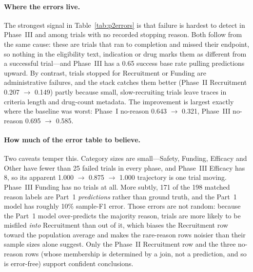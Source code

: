 \paragraph{Where the errors live.}
The strongest signal in Table~\ref{tab:p2errors} is that failure is hardest to
detect in Phase~III and among trials with no recorded stopping reason. Both follow
from the same cause: these are trials that ran to completion and missed their
endpoint, so nothing in the eligibility text, indication or drug marks them as
different from a successful trial---and Phase~III has a 0.65 success base rate
pulling predictions upward. By contrast, trials stopped for Recruitment or Funding
are administrative failures, and the stack catches them better (Phase~II
Recruitment 0.207 $\to$ 0.149) partly because small, slow-recruiting trials leave
traces in criteria length and drug-count metadata. The improvement is largest
exactly where the baseline was worst: Phase~I no-reason 0.643 $\to$ 0.321,
Phase~III no-reason 0.695 $\to$ 0.585.

\paragraph{How much of the error table to believe.}
Two caveats temper this. Category sizes are small---Safety, Funding, Efficacy and
Other have fewer than 25 failed trials in every phase, and Phase~III Efficacy has
8, so its apparent 1.000 $\to$ 0.875 $\to$ 1.000 trajectory is one trial moving.
Phase~III Funding has no trials at all. More subtly, 171 of the 198 matched reason
labels are Part~1 \emph{predictions} rather than ground truth, and the Part~1
model has roughly 10\% sample-F1 error. Those errors are not random: because the
Part~1 model over-predicts the majority reason, trials are more likely to be
misfiled \emph{into} Recruitment than out of it, which biases the Recruitment row
toward the population average and makes the rare-reason rows noisier than their
sample sizes alone suggest. Only the Phase~II Recruitment row and the three
no-reason rows (whose membership is determined by a join, not a prediction, and so
is error-free) support confident conclusions.

